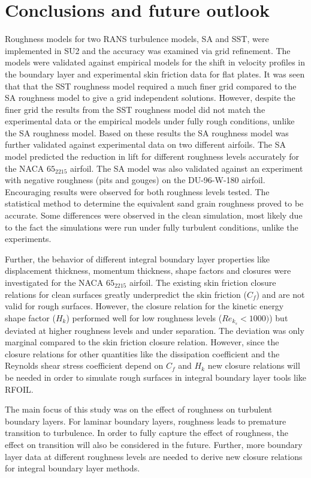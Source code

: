 \section{Conclusions and future outlook}\label{sec:conclusions}
Roughness models for two RANS turbulence models, SA and SST, were implemented in SU2 and the accuracy was examined via grid refinement. The models were validated against empirical models for the shift in velocity profiles in the boundary layer and experimental skin friction data for flat plates. It was seen that that the SST roughness model required a much finer grid compared to the SA roughness model to give a grid independent solutions. However, despite the finer grid the results from the SST roughness model did not match the experimental data or the empirical models under fully rough conditions, unlike the SA roughness model. Based on these results the SA roughness model was further validated against experimental data on two different airfoils. The SA model predicted the reduction in lift for different roughness levels accurately for the NACA $65_2215$ airfoil. The SA model was also validated against an experiment with negative roughness (pits and gouges) on the DU-96-W-180 airfoil. Encouraging results were observed for both roughness levels tested. The statistical method to determine the equivalent sand grain roughness proved to be accurate. Some differences were observed in the clean simulation, most likely due to the fact the simulations were run under fully turbulent conditions, unlike the experiments. 

Further, the behavior of different integral boundary layer properties like displacement thickness, momentum thickness, shape factors and closures were investigated for the NACA $65_2215$ airfoil. The existing skin friction closure relations for clean surfaces greatly underpredict the skin friction ($C_f$) and are not valid for rough surfaces. However, the closure relation for the kinetic energy shape factor ($H_k$) performed well for low roughness levels ($Re_{k_s} < 1000)$) but deviated at higher roughness levels and under separation. The deviation was only marginal compared to the skin friction closure relation. However, since the closure relations for other quantities like the dissipation coefficient and the Reynolds shear stress coefficient depend on $C_f$ and $H_k$ new closure relations will be needed in order to simulate rough surfaces in integral boundary layer tools like RFOIL.

The main focus of this study was on the effect of roughness on turbulent boundary layers. For laminar boundary layers, roughness leads to premature transition to turbulence.  In order to fully capture the effect of roughness, the effect on transition will also be considered in the future. Further, more boundary layer data at different roughness levels are needed to derive new closure relations for integral boundary layer methods.
